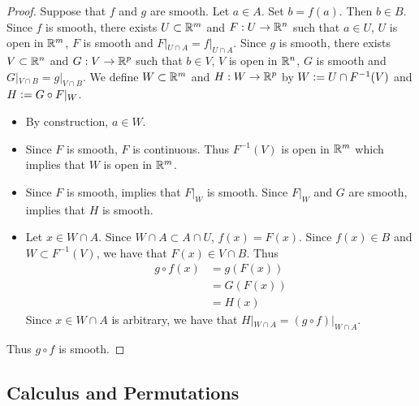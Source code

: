 \documentclass{book}
\begin{document}
	\begin{proof}
		Suppose that $f$ and $g$ are smooth. Let $a \in A$. Set $b = f(a)$. Then $b \in B$. Since $f$ is smooth, there exists $U \subset \mathbb{R}^m$ and $F:U \rightarrow \mathbb{R}^n$ such that $a \in U$, $U$ is open in $\mathbb{R}^m$, $F$ is smooth and $F|_{U \cap A} = f|_{U \cap A}$. Since $g$ is smooth, there exists $V \subset \mathbb{R}^n$ and $G:V \rightarrow \mathbb{R}^p$ such that $b \in V$, $V$ is open in $\mathbb{R}^n$, $G$ is smooth and $G|_{V \cap B} = g|_{V \cap B}$. We define $W \subset \mathbb{R}^m$ and $H:W \rightarrow \mathbb{R}^p$ by $W \vcentcolon= U \cap F^{-1}(V)$ and $H \vcentcolon= G \circ F|_W$. 
		\begin{itemize}
			\item By construction, $a \in W$. 
			\item Since $F$ is smooth, $F$ is continuous. Thus $F^{-1}(V)$ is open in $\mathbb{R}^m$ which implies that $W$ is open in $\mathbb{R}^m$. 
			\item Since $F$ is smooth,  implies that $F|_W$ is smooth. Since $F|_W$ and $G$ are smooth,  implies that $H$ is smooth. 
			\item Let $x \in W \cap A$. Since $W \cap A \subset A \cap U$, $f(x) = F(x)$. Since $f(x) \in B$ and $W \subset F^{-1}(V)$, we have that $F(x) \in V \cap B$. Thus  
			\begin{align*}
				g \circ f(x)
				& = g (F(x)) \\
				& = G(F(x)) \\
				& = H(x) 
			\end{align*} 
			Since $x \in W \cap A$ is arbitrary, we have that $H|_{W \cap A} = (g \circ f)|_{W \cap A}$.
		\end{itemize}
		Thus $g \circ f$ is smooth.
	\end{proof}
	
	
	
	
	
	
	
	
	
	
	
	
	
	
	
	
	
	
	
	
	
	
	
	\subsection{Calculus and Permutations}
	
\end{document}
